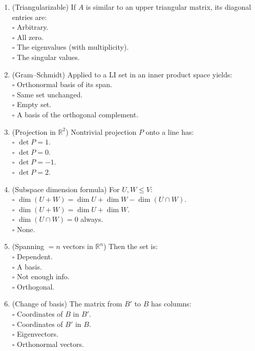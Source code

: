 \documentclass[11pt]{article}
\begin{document}
\begin{enumerate}
\item (Triangularizable) If $A$ is similar to an upper triangular matrix, its diagonal entries are:\\
\(\square\) Arbitrary.\\
\(\square\) All zero.\\
\(\square\) The eigenvalues (with multiplicity).\\
\(\square\) The singular values.

\item (Gram–Schmidt) Applied to a LI set in an inner product space yields:\\
\(\square\) Orthonormal basis of its span.\\
\(\square\) Same set unchanged.\\
\(\square\) Empty set.\\
\(\square\) A basis of the orthogonal complement.

\item (Projection in $\mathbb{R}^2$) Nontrivial projection $P$ onto a line has:\\
\(\square\) $\det P=1$.\\
\(\square\) $\det P=0$.\\
\(\square\) $\det P=-1$.\\
\(\square\) $\det P=2$.

\item (Subspace dimension formula) For $U,W\le V$:\\
\(\square\) $\dim(U+W)=\dim U+\dim W-\dim(U\cap W)$.\\
\(\square\) $\dim(U+W)=\dim U+\dim W$.\\
\(\square\) $\dim(U\cap W)=0$ always.\\
\(\square\) None.

\item (Spanning $=n$ vectors in $\mathbb{R}^n$) Then the set is:\\
\(\square\) Dependent.\\
\(\square\) A basis.\\
\(\square\) Not enough info.\\
\(\square\) Orthogonal.

\item (Change of basis) The matrix from $B'$ to $B$ has columns:\\
\(\square\) Coordinates of $B$ in $B'$.\\
\(\square\) Coordinates of $B'$ in $B$.\\
\(\square\) Eigenvectors.\\
\(\square\) Orthonormal vectors.


\end{enumerate}
\end{document}
